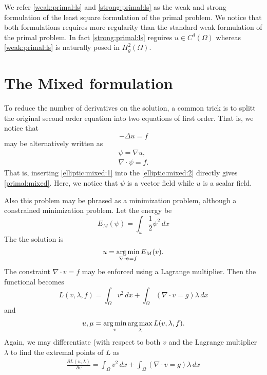 We refer \eqref{weak:primal:ls} and \eqref{strong:primal:ls} as the weak and strong formulation of the least square formulation of the
primal problem.  
We notice that both formulations requires more regularity than the standard weak formulation of the primal problem. In fact 
\eqref{strong:primal:ls} reguires $u \in C^4(\Omega)$ whereas   
\eqref{weak:primal:ls} is naturally posed in $H^2_g(\Omega)$.  

\section{The Mixed formulation}

To reduce the number of derivatives on the solution, a common 
trick is to splitt the original second order equation into 
two equations of first order. That is, we notice that
\begin{equation} 
\label{primal:mixed}
-\Delta u = f 
\end{equation} 
may be alternatively written as 
\begin{align}
\label{elliptic:mixed:1}
\psi = \nabla u, \\ 
\label{elliptic:mixed:2}
\nabla \cdot \psi = f . 
\end{align}
That is, inserting \eqref{elliptic:mixed:1} into the \eqref{elliptic:mixed:2} directly gives 
\eqref{primal:mixed}. Here, we notice that $\psi$ is a vector field while $u$ is a scalar field.  

Also this problem may be phrased as a minimization problem, although a constrained minimization problem. 
Let the energy be 
\[
E_{M}(\psi) = \int_\omega \frac{1}{2} \psi^2 \, dx  
\]
The the solution is  
\begin{align}
u = \operatorname*{arg\,min}_{\nabla \cdot \psi = f  } E_{M} (v) .   
\end{align}
The constraint $\nabla \cdot v = f$ may be enforced using a Lagrange multiplier. Then the functional
becomes  
\[
L(v,\lambda, f) = \int_\Omega v^2 \, dx + \int_\Omega (\nabla \cdot v = g) \lambda  \, dx   
\]
and 
\begin{align}
u, \mu = \operatorname*{arg\,min}_{v} \operatorname*{arg\,max}_{\lambda} L(v, \lambda, f) .   
\end{align}
Again, we may differentiate (with respect to both $v$ and the Lagrange multiplier $\lambda$ to find the extremal points of $L$ 
as 
\begin{align}
 \frac{\partial L (u, \lambda)}{ \partial v} =  \int_\Omega v^2 \, dx + \int_\Omega (\nabla \cdot v = g) \lambda  \, dx   
\end{align}


 
